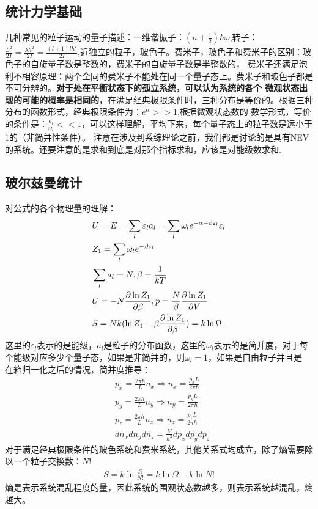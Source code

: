 \documentclass[UTF8]{ctexart}
\begin{document}
\subsection{统计力学基础}
几种常见的粒子运动的量子描述：一维谐振子：$(n+\frac{1}{2})\hbar \omega$,转子：$\frac{L^2}{2I}=\frac{\lambda \hbar^2}{2I}
        =\frac{(l+1)l\hbar^2}{2I}$,近独立的粒子，玻色子。费米子，玻色子和费米子的区别：玻色子的自旋量子数是整数的，费米子的自旋量子数是半整数的，
费米子还满足泡利不相容原理：两个全同的费米子不能处在同一个量子态上。费米子和玻色子都是不可分辨的。\textbf{对于处在平衡状态下的孤立系统，可以认为系统的各个
        微观状态出现的可能的概率是相同的}，在满足经典极限条件时，三种分布是等价的。根据三种分布的函数形式，经典极限条件为：$e^\alpha>>1$,根据微观状态数的
数学形式，等价的条件是：$\frac{a_l}{\omega_l}<<1$，可以这样理解，平均下来，每个量子态上的粒子数是远小于1的（非简并性条件）。
注意在涉及到系综理论之前，我们都是讨论的是具有NEV的系统。还要注意的是求和到底是对那个指标求和，应该是对能级数求和.
\subsection{玻尔兹曼统计}
对公式的各个物理量的理解：
\begin{align*}
         & U=E=\sum_l \varepsilon_l a_l =\sum_l \omega_l e^{-\alpha-\beta\varepsilon_l} \varepsilon_l \\
         & Z_1 = \sum _l \omega_l e^{-\beta \varepsilon_l}                                            \\
         & \sum_l a_l = N,\beta=\frac{1}{kT}                                                          \\
         & U=-N\pdv{\ln Z_1}{\beta},p=\frac{N}{\beta}\pdv{\ln Z_1}{V}                                 \\
         & S=Nk(\ln Z_1 -\beta \pdv{\ln Z_1}{\beta})=k\ln \Omega
\end{align*}
这里的$\varepsilon_l$表示的是能级，$a_l$是粒子的分布函数，这里的$\omega_l$表示的是简并度，对于每个能级对应多少个量子态，如果是非简并的，则$\omega_l=1$，如果是自由粒子并且是
在箱归一化之后的情况，简并度推导：
\begin{align*}
         & p_x=\frac{2\pi \hbar}{L}n_x\Rightarrow n_x=\frac{p_x L}{2\pi \hbar} \\
         & p_y=\frac{2\pi \hbar}{L}n_y\Rightarrow n_y=\frac{p_y L}{2\pi \hbar} \\
         & p_z=\frac{2\pi \hbar}{L}n_z\Rightarrow n_z=\frac{p_z L}{2\pi \hbar} \\
         & dn_x dn_y dn_z = \frac{V}{h^3}dp_x dp_y dp_z
\end{align*}
对于满足经典极限条件的玻色系统和费米系统，其他关系式均成立，除了熵需要除以一个粒子交换数：$N!$
\begin{align*}
        S=k\ln \frac{\Omega}{N!}=k\ln \Omega - k\ln N!
\end{align*}
熵是表示系统混乱程度的量，因此系统的围观状态数越多，则表示系统越混乱，熵越大。
\end{document}
